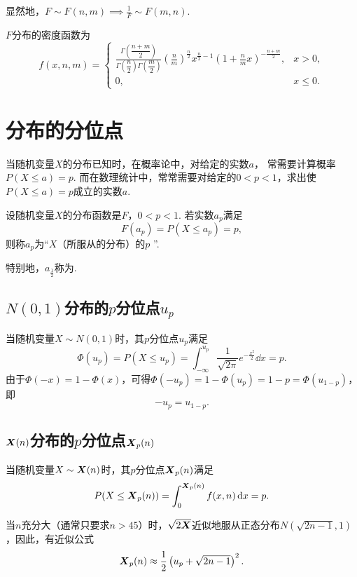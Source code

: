显然地，\(F \sim F(n,m) \implies \frac{1}{F} \sim F(m,n)\).

\begin{theorem}
\(F\)分布的密度函数为\[
	f(x,n,m) = \left\{ \begin{array}{cl}
		\frac{\Gamma\left(\dfrac{n+m}{2}\right)}{\Gamma\left(\dfrac{n}{2}\right) \Gamma\left(\dfrac{m}{2}\right)} \left(\frac{n}{m}\right)^{\frac{n}{2}} x^{\frac{n}{2}-1} \left(1+\frac{n}{m}x\right)^{-\frac{n+m}{2}}, & x > 0, \\
		0, & x \leq 0.
	\end{array} \right.
\]
\end{theorem}

\section{分布的分位点}
当随机变量\(X\)的分布已知时，在概率论中，对给定的实数\(a\)，
常需要计算概率\(P(X \leq a) = p\).
而在数理统计中，常常需要对给定的\(0<p<1\)，求出使\(P(X \leq a) = p\)成立的实数\(a\).

\begin{definition}
设随机变量\(X\)的分布函数是\(F\)，\(0<p<1\).
若实数\(a_p\)满足\[
	F(a_p) = P(X \leq a_p) = p,
\]则称\(a_p\)为“\(X\)（所服从的分布）的\(p\) ”.

特别地，\(a_{\frac{1}{2}}\)称为.
\end{definition}

\subsection{\texorpdfstring{\(N(0,1)\)分布的\(p\)分位点\(u_p\)}{标准正态分布的p分位点}}
当随机变量\(X \sim N(0,1)\)时，其\(p\)分位点\(u_p\)满足\[
\Phi(u_p)
= P(X \leq u_p)
= \int_{-\infty}^{u_p} \frac{1}{\sqrt{2\pi}} e^{-\frac{x^2}{2}} \dd{x}
= p.
\]由于\(\Phi(-x)=1-\Phi(x)\)，可得\(\Phi(-u_p)=1-\Phi(u_p)=1-p=\Phi(u_{1-p})\)，即\begin{equation}
-u_p=u_{1-p}.
\end{equation}

\subsection{\texorpdfstring{\(\boldsymbol{X}(n)\)分布的\(p\)分位点\(\boldsymbol{X}_p(n)\)}{卡方分布的p分位点}}
当随机变量\(X \sim \boldsymbol{X}(n)\)时，其\(p\)分位点\(\boldsymbol{X}_p(n)\)满足\[
P(X \leq \boldsymbol{X}_p(n)) = \int_0^{\boldsymbol{X}_p(n)} f(x,n) \dd{x} = p.
\]

当\(n\)充分大（通常只要求\(n>45\)）时，\(\sqrt{2\boldsymbol{X}}\)近似地服从正态分布\(N(\sqrt{2n-1},1)\)，因此，有近似公式\begin{equation}
\boldsymbol{X}_p(n) \approx \frac{1}{2}\left(u_p+\sqrt{2n-1}\right)^2.
\end{equation}

